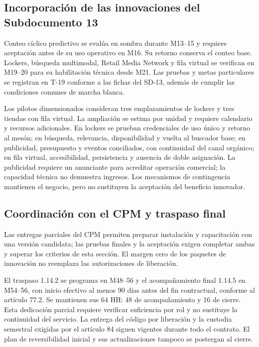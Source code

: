 \documentclass[11pt]{article}
\begin{document}
\subsection*{Incorporación de las innovaciones del Subdocumento 13}

Conteo cíclico predictivo se evalúa en sombra durante M13–15 y requiere aceptación antes de su uso operativo en M16. Su retorno conserva el conteo base. Lockers, búsqueda multimodal, Retail Media Network y fila virtual se verifican en M19–20 para su habilitación técnica desde M21. Las pruebas y metas particulares se registran en T-19 conforme a las fichas del SD-13, además de cumplir las condiciones comunes de marcha blanca.

Los pilotos dimensionados consideran tres emplazamientos de lockers y tres tiendas con fila virtual. La ampliación se estima por unidad y requiere calendario y recursos adicionales. En lockers se prueban credenciales de uso único y retorno al mesón; en búsqueda, relevancia, disponibilidad y vuelta al buscador base; en publicidad, presupuesto y eventos conciliados, con continuidad del canal orgánico; en fila virtual, accesibilidad, persistencia y ausencia de doble asignación. La publicidad requiere un anunciante para acreditar operación comercial; la capacidad técnica no demuestra ingresos. Los mecanismos de contingencia mantienen el negocio, pero no sustituyen la aceptación del beneficio innovador.

\subsection*{Coordinación con el CPM y traspaso final}

Las entregas parciales del CPM permiten preparar instalación y capacitación con una versión candidata; las pruebas finales y la aceptación exigen completar ambas y superar los criterios de esta sección. El margen cero de los paquetes de innovación no reemplaza las autorizaciones de liberación.

El traspaso 1.14.2 se programa en M48–56 y el acompañamiento final 1.14.5 en M54–56, con inicio efectivo al menos 90 días antes del fin contractual, conforme al artículo 77.2. Se mantienen sus 64 HH: 48 de acompañamiento y 16 de cierre. Esta dedicación parcial requiere verificar suficiencia por rol y no sustituye la continuidad del servicio. La entrega del código por liberación y la custodia semestral exigidas por el artículo 84 siguen vigentes durante todo el contrato. El plan de reversibilidad inicial y sus actualizaciones tampoco se postergan al cierre.
\end{document}
